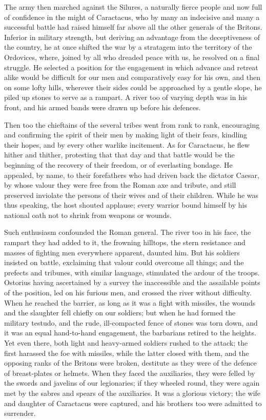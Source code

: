 
The army then marched against the Silures, a naturally fierce people and now full of confidence in the might of Caractacus, who by many an indecisive and many a successful battle had raised himself far above all the other generals of the Britons. Inferior in military strength, but deriving an advantage from the deceptiveness of the country, he at once shifted the war by a stratagem into the territory of the Ordovices, where, joined by all who dreaded peace with us, he resolved on a final struggle. He selected a position for the engagement in which advance and retreat alike would be difficult for our men and comparatively easy for his own, and then on some lofty hills, wherever their sides could be approached by a gentle slope, he piled up stones to serve as a rampart. A river too of varying depth was in his front, and his armed bands were drawn up before his defences.


Then too the chieftains of the several tribes went from rank to rank, encouraging and confirming the spirit of their men by making light of their fears, kindling their hopes, and by every other warlike incitement. As for Caractacus, he flew hither and thither, protesting that that day and that battle would be the beginning of the recovery of their freedom, or of everlasting bondage. He appealed, by name, to their forefathers who had driven back the dictator Caesar, by whose valour they were free from the Roman axe and tribute, and still preserved inviolate the persons of their wives and of their children. While he was thus speaking, the host shouted applause; every warrior bound himself by his national oath not to shrink from weapons or wounds.


Such enthusiasm confounded the Roman general. The river too in his face, the rampart they had added to it, the frowning hilltops, the stern resistance and masses of fighting men everywhere apparent, daunted him. But his soldiers insisted on battle, exclaiming that valour could overcome all things; and the prefects and tribunes, with similar language, stimulated the ardour of the troops. Ostorius having ascertained by a survey the inaccessible and the assailable points of the position, led on his furious men, and crossed the river without difficulty. When he reached the barrier, as long as it was a fight with missiles, the wounds and the slaughter fell chiefly on our soldiers; but when he had formed the military testudo, and the rude, ill-compacted fence of stones was torn down, and it was an equal hand-to-hand engagement, the barbarians retired to the heights. Yet even there, both light and heavy-armed soldiers rushed to the attack; the first harassed the foe with missiles, while the latter closed with them, and the opposing ranks of the Britons were broken, destitute as they were of the defence of breast-plates or helmets. When they faced the auxiliaries, they were felled by the swords and javelins of our legionaries; if they wheeled round, they were again met by the sabres and spears of the auxiliaries. It was a glorious victory; the wife and daughter of Caractacus were captured, and his brothers too were admitted to surrender.

